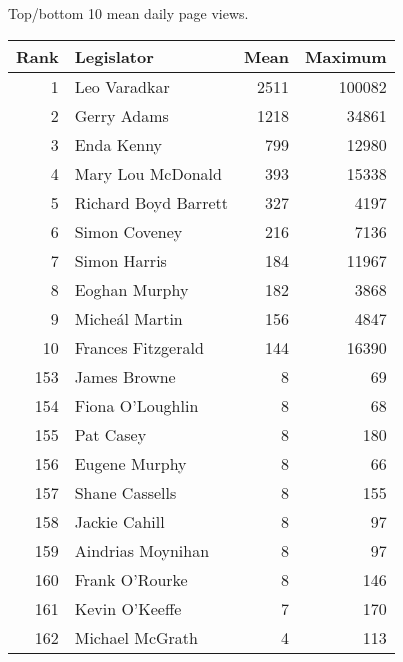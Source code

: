 \centering
\caption{Top/bottom 10 mean daily page views.\label{tab:pageviewstopirl}} 
\begingroup\scriptsize
\begin{tabular}{rlrr}
  \toprule
Rank & Legislator & Mean & Maximum \\ 
  \midrule
1 & Leo Varadkar & 2511 & 100082 \\ 
  2 & Gerry Adams & 1218 & 34861 \\ 
  3 & Enda Kenny & 799 & 12980 \\ 
  4 & Mary Lou McDonald & 393 & 15338 \\ 
  5 & Richard Boyd Barrett & 327 & 4197 \\ 
   \midrule
6 & Simon Coveney & 216 & 7136 \\ 
  7 & Simon Harris & 184 & 11967 \\ 
  8 & Eoghan Murphy & 182 & 3868 \\ 
  9 & Micheál Martin & 156 & 4847 \\ 
  10 & Frances Fitzgerald & 144 & 16390 \\ 
   \midrule
153 & James Browne & 8 & 69 \\ 
  154 & Fiona O'Loughlin & 8 & 68 \\ 
  155 & Pat Casey & 8 & 180 \\ 
  156 & Eugene Murphy & 8 & 66 \\ 
  157 & Shane Cassells & 8 & 155 \\ 
   \midrule
158 & Jackie Cahill & 8 & 97 \\ 
  159 & Aindrias Moynihan & 8 & 97 \\ 
  160 & Frank O'Rourke & 8 & 146 \\ 
  161 & Kevin O'Keeffe & 7 & 170 \\ 
  162 & Michael McGrath & 4 & 113 \\ 
   \bottomrule
\end{tabular}
\endgroup
